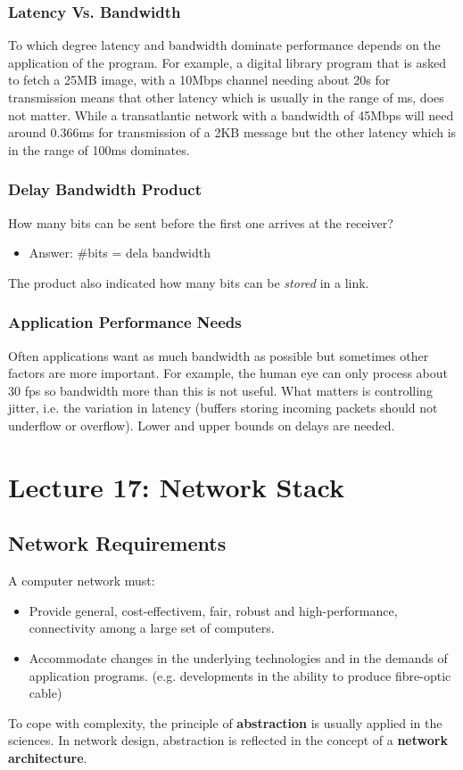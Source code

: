 \documentclass{article}%
\begin{document}
\subsubsection{Latency Vs. Bandwidth}
\label{sec:org176c629}
To which degree latency and bandwidth dominate performance depends on the application of the program.
For example, a digital library program that is asked to fetch a 25MB image, with a 10Mbps channel needing about 20s for transmission means that other latency which is usually in the range of ms, does not matter.
While a transatlantic network with a bandwidth of 45Mbps will need around 0.366ms for transmission of a 2KB message but the other latency which is in the range of 100ms dominates.

\subsubsection{Delay \texttimes{} Bandwidth Product}
\label{sec:org0c5e0c8}
How many bits can be sent before the first one arrives at the receiver?
\begin{itemize}
\item Answer: \#bits = dela \texttimes{} bandwidth
\end{itemize}
The product also indicated how many bits can be \emph{stored} in a link.

\subsubsection{Application Performance Needs}
\label{sec:org0cd8106}
Often applications want as much bandwidth as possible but sometimes other factors are more important.
For example, the human eye can only process about 30 fps so bandwidth more than this is not useful.
What matters is controlling jitter, i.e. the variation in latency (buffers storing incoming packets should not underflow or overflow).
Lower and upper bounds on delays are needed.

\maketitle
\section{Lecture 17: Network Stack}


\subsection{Network Requirements}
\label{sec:orgba87a1e}
A computer network must:
\begin{itemize}
\item Provide general, cost-effectivem, fair, robust and high-performance, connectivity among a large set of computers.
\item Accommodate changes in the underlying technologies and in the demands of application programs. (e.g. developments in the ability to produce fibre-optic cable)
\end{itemize}
To cope with complexity, the principle of \textbf{abstraction} is usually applied in the sciences.
In network design, abstraction is reflected in the concept of a \textbf{network architecture}.
\end{document}

